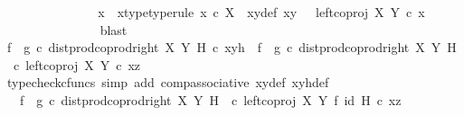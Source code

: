 \begin{isabellebody}
\ \ \ \ \ \ \ \ \ \ \ \ \isamarkupfalse%
\ \isamarkupfalse%
\ x\ \ x{\isacharunderscore}{\kern0pt}type{\isacharbrackleft}{\kern0pt}type{\isacharunderscore}{\kern0pt}rule{\isacharbrackright}{\kern0pt}{\isacharcolon}{\kern0pt}\ {\isachardoublequoteopen}x\ {\isasymin}\isactrlsub c\ X{\isachardoublequoteclose}\ \ xy{\isacharunderscore}{\kern0pt}def{\isacharcolon}{\kern0pt}\ {\isachardoublequoteopen}xy\ {\isacharequal}{\kern0pt}\ \ left{\isacharunderscore}{\kern0pt}coproj\ X\ Y\ {\isasymcirc}\isactrlsub c\ x{\isachardoublequoteclose}\isanewline
\ \ \ \ \ \ \ \ \ \ \ \ \ \ \isamarkupfalse%
\ blast\isanewline
\ \ \ \ \ \ \ \ \ \ \ \ \isamarkupfalse%
\ {\isachardoublequoteopen}{\isacharparenleft}{\kern0pt}f\isactrlsup {\isasymflat}\ {\isasymamalg}\ g\isactrlsup {\isasymflat}\ {\isasymcirc}\isactrlsub c\ dist{\isacharunderscore}{\kern0pt}prod{\isacharunderscore}{\kern0pt}coprod{\isacharunderscore}{\kern0pt}right\ X\ Y\ H{\isacharparenright}{\kern0pt}\ {\isasymcirc}\isactrlsub c\ xyh\ {\isacharequal}{\kern0pt}\ {\isacharparenleft}{\kern0pt}f\isactrlsup {\isasymflat}\ {\isasymamalg}\ g\isactrlsup {\isasymflat}{\isacharparenright}{\kern0pt}\ {\isasymcirc}\isactrlsub c\ {\isacharparenleft}{\kern0pt}dist{\isacharunderscore}{\kern0pt}prod{\isacharunderscore}{\kern0pt}coprod{\isacharunderscore}{\kern0pt}right\ X\ Y\ H\ \ {\isasymcirc}\isactrlsub c\ {\isasymlangle}left{\isacharunderscore}{\kern0pt}coproj\ X\ Y\ {\isasymcirc}\isactrlsub c\ x{\isacharcomma}{\kern0pt}z{\isasymrangle}{\isacharparenright}{\kern0pt}{\isachardoublequoteclose}\isanewline
\ \ \ \ \ \ \ \ \ \ \ \ \ \ \isamarkupfalse%
\ {\isacharparenleft}{\kern0pt}typecheck{\isacharunderscore}{\kern0pt}cfuncs{\isacharcomma}{\kern0pt}\ simp\ add{\isacharcolon}{\kern0pt}\ comp{\isacharunderscore}{\kern0pt}associative{}\ xy{\isacharunderscore}{\kern0pt}def\ xyh{\isacharunderscore}{\kern0pt}def{\isacharparenright}{\kern0pt}\isanewline
\ \ \ \ \ \ \ \ \ \ \ \ \isamarkupfalse%
\ \isamarkupfalse%
\ {\isachardoublequoteopen}{\isachardot}{\kern0pt}{\isachardot}{\kern0pt}{\isachardot}{\kern0pt}\ {\isacharequal}{\kern0pt}\ {\isacharparenleft}{\kern0pt}f\isactrlsup {\isasymflat}\ {\isasymamalg}\ g\isactrlsup {\isasymflat}{\isacharparenright}{\kern0pt}\ {\isasymcirc}\isactrlsub c\ {\isacharparenleft}{\kern0pt}{\isacharparenleft}{\kern0pt}dist{\isacharunderscore}{\kern0pt}prod{\isacharunderscore}{\kern0pt}coprod{\isacharunderscore}{\kern0pt}right\ X\ Y\ H\ \ {\isasymcirc}\isactrlsub c\ {\isacharparenleft}{\kern0pt}left{\isacharunderscore}{\kern0pt}coproj\ X\ Y\ {\isasymtimes}\isactrlsub f\ id\ H{\isacharparenright}{\kern0pt}{\isacharparenright}{\kern0pt}\ {\isasymcirc}\isactrlsub c\ {\isasymlangle}x{\isacharcomma}{\kern0pt}z{\isasymrangle}{\isacharparenright}{\kern0pt}{\isachardoublequoteclose}\isanewline

\end{isabellebody}
